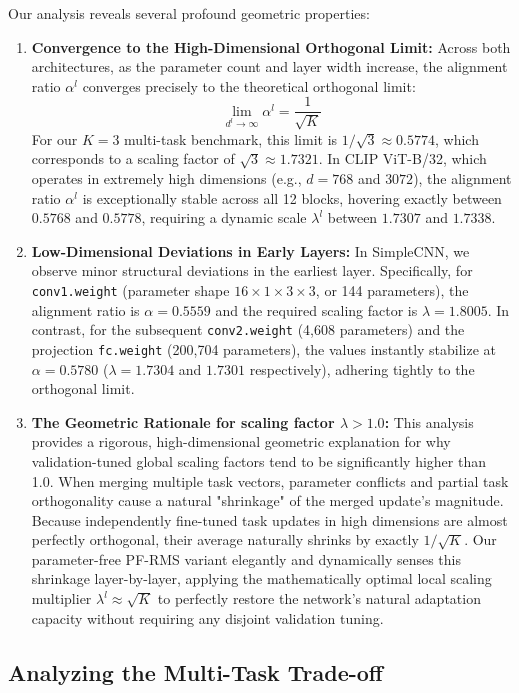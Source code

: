 Our analysis reveals several profound geometric properties:
\begin{enumerate}
    \item \textbf{Convergence to the High-Dimensional Orthogonal Limit:} Across both architectures, as the parameter count and layer width increase, the alignment ratio $\alpha^l$ converges precisely to the theoretical orthogonal limit:
    $$\lim_{d^l \to \infty} \alpha^l = \frac{1}{\sqrt{K}}$$
    For our $K=3$ multi-task benchmark, this limit is $1/\sqrt{3} \approx 0.5774$, which corresponds to a scaling factor of $\sqrt{3} \approx 1.7321$. In CLIP ViT-B/32, which operates in extremely high dimensions (e.g., $d = 768$ and $3072$), the alignment ratio $\alpha^l$ is exceptionally stable across all 12 blocks, hovering exactly between $0.5768$ and $0.5778$, requiring a dynamic scale $\lambda^l$ between $1.7307$ and $1.7338$.
    \item \textbf{Low-Dimensional Deviations in Early Layers:} In SimpleCNN, we observe minor structural deviations in the earliest layer. Specifically, for \texttt{conv1.weight} (parameter shape $16 \times 1 \times 3 \times 3$, or 144 parameters), the alignment ratio is $\alpha = 0.5559$ and the required scaling factor is $\lambda = 1.8005$. In contrast, for the subsequent \texttt{conv2.weight} (4,608 parameters) and the projection \texttt{fc.weight} (200,704 parameters), the values instantly stabilize at $\alpha = 0.5780$ ($\lambda = 1.7304$ and $1.7301$ respectively), adhering tightly to the orthogonal limit.
    \item \textbf{The Geometric Rationale for scaling factor $\lambda > 1.0$:} This analysis provides a rigorous, high-dimensional geometric explanation for why validation-tuned global scaling factors tend to be significantly higher than 1.0. When merging multiple task vectors, parameter conflicts and partial task orthogonality cause a natural "shrinkage" of the merged update's magnitude. Because independently fine-tuned task updates in high dimensions are almost perfectly orthogonal, their average naturally shrinks by exactly $1/\sqrt{K}$. Our parameter-free PF-RMS variant elegantly and dynamically senses this shrinkage layer-by-layer, applying the mathematically optimal local scaling multiplier $\lambda^l \approx \sqrt{K}$ to perfectly restore the network's natural adaptation capacity without requiring any disjoint validation tuning.
\end{enumerate}

\subsection{Analyzing the Multi-Task Trade-off}

